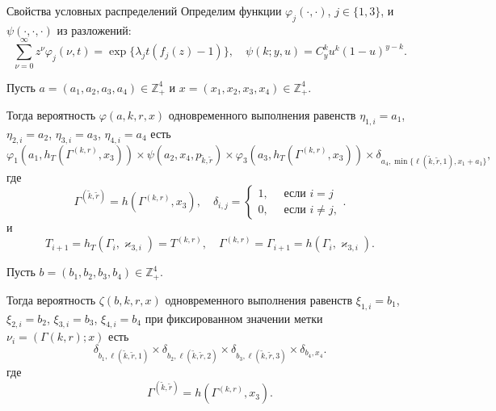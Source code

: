 \documentclass[10pt]{beamer}
\begin{document}
\begin{frame}[allowframebreaks]{Свойства условных распределений}
Определим функции $\varphi_j(\cdot,\cdot)$, $j\in \{1,3\}$, и $\psi(\cdot, \cdot, \cdot)$ из разложений:
\begin{equation*}
\sum_{\nu=0}^{\infty} z^\nu\varphi_j(\nu,t) = \exp\{\lambda_j t (f_j(z)-1)\}, \quad \psi(k;y,u)=C_y^k u^k (1-u)^{y-k}.	
\end{equation*}

Пусть $a=(a_1, a_2, a_3, a_4) \in \mathbb{Z}_+^4$ и $x=(x_1, x_2, x_3, x_4) \in \mathbb{Z}_+^4$.

Тогда вероятность $\varphi(a,k,r,x)$ одновременного выполнения равенств $\eta_{1,i}=a_1$, $\eta_{2,i}=a_2$, $\eta_{3,i}=a_3$, $\eta_{4,i}=a_4$ есть 
\begin{equation*}
\!\!\varphi_1(a_1,h_T(\Gamma^{({k},{r})},x_3)) \times \psi(a_2,x_4, p_{\tilde{k},\tilde{r}}) \times \varphi_3(a_3,h_T(\Gamma^{({k},{r})},x_3))
\times \delta_{a_4,\min{\{\ell(\tilde{k},\tilde{r},1), x_1+a_1}\}},
\end{equation*}
где
\begin{equation*}
\Gamma^{(\tilde{k},\tilde{r})}=h(\Gamma^{(k,r)},x_3), \quad \delta_{i,j}=\begin{cases} 1, \quad \text{ если }i=j\\0, \quad \text{ если } i\neq j,
\end{cases}.
\end{equation*}
и 
$$
T_{i+1}=h_T(\Gamma_i,\varkappa_{3,i})= T^{(k,r)},\quad  \Gamma^{(k,r)}=\Gamma_{i+1}=h(\Gamma_i,\varkappa_{3,i}).
$$
\framebreak

Пусть $b=(b_1, b_2, b_3, b_4) \in \mathbb{Z}_+^4$. 

Тогда вероятность $\zeta(b, k, r, x)$ одновременного выполнения равенств $\xi_{1,i}=b_1$, $\xi_{2,i}=b_2$, $\xi_{3,i}=b_3$, $\xi_{4,i}=b_4$ при фиксированном значении метки $\nu_i=(\Gamma{(k,r)}; x)$ есть
\begin{equation*}
\delta_{b_1,\ell(\tilde{k},\tilde{r},1)} \times \delta_{b_2,\ell(\tilde{k},\tilde{r},2)} \times 
\delta_{b_3,\ell(\tilde{k},\tilde{r},3)} \times \delta_{b_4,x_4}.
\end{equation*}
где
\begin{equation*}
\Gamma^{(\tilde{k},\tilde{r})}=h(\Gamma^{(k,r)},x_3).
\end{equation*}
\end{frame}
\end{document}
